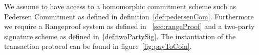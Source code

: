 We assume to have access to a homomorphic commitment scheme such as Pedersen Commitment as defined in definition~\ref{def:pedersenCom}. Furthermore we require a Rangeproof system as defined in
~\ref{sec:rangeProof} and a two-party signature scheme as defined in~\ref{def:twoPartySig}. The instantiation of the transaction protocol can be found in figure~\ref{fig:payToCoin}.
\begin{figure}
    \begin{center}
\end{center}
\end{figure}
